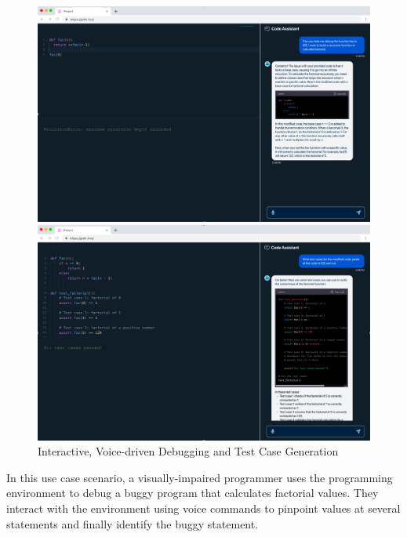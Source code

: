 \begin{figure}[t]
\centering
\begin{minipage}{.48\textwidth}
\centering
\includegraphics[width=.98\textwidth]{p4h-5}
\end{minipage}
\begin{minipage}{.48\textwidth}
\centering
\includegraphics[width=.98\textwidth]{p4h-6}
\end{minipage}  
\caption{Interactive, Voice-driven Debugging and Test Case Generation}
\label{thrust3-three}
\end{figure}

 In this use case scenario, a visually-impaired
programmer uses the programming environment to debug a buggy program
that calculates factorial values. They interact with the environment
using voice commands to pinpoint values at several statements and
finally identify the buggy statement.


